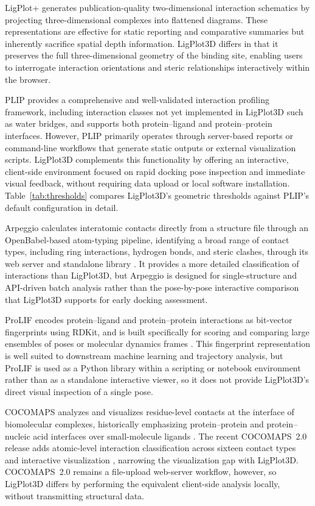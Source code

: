 \documentclass[journal=jacsat,manuscript=article]{achemso}
\begin{document}
LigPlot+ generates publication-quality two-dimensional interaction schematics by projecting three-dimensional complexes into flattened diagrams. These representations are effective for static reporting and comparative summaries but inherently sacrifice spatial depth information. LigPlot3D differs in that it preserves the full three-dimensional geometry of the binding site, enabling users to interrogate interaction orientations and steric relationships interactively within the browser.

PLIP provides a comprehensive and well-validated interaction profiling framework, including interaction classes not yet implemented in LigPlot3D such as water bridges, and supports both protein--ligand and protein--protein interfaces. However, PLIP primarily operates through server-based reports or command-line workflows that generate static outputs or external visualization scripts. LigPlot3D complements this functionality by offering an interactive, client-side environment focused on rapid docking pose inspection and immediate visual feedback, without requiring data upload or local software installation. Table~\ref{tab:thresholds} compares LigPlot3D's geometric thresholds against PLIP's default configuration in detail.

Arpeggio calculates interatomic contacts directly from a structure file through an OpenBabel-based atom-typing pipeline, identifying a broad range of contact types, including ring interactions, hydrogen bonds, and steric clashes, through its web server and standalone library \cite{jubb2017arpeggio}. It provides a more detailed classification of interactions than LigPlot3D, but Arpeggio is designed for single-structure and API-driven batch analysis rather than the pose-by-pose interactive comparison that LigPlot3D supports for early docking assessment.


ProLIF encodes protein--ligand and protein--protein interactions as bit-vector fingerprints using RDKit, and is built specifically for scoring and comparing large ensembles of poses or molecular dynamics frames \cite{bouysset2021prolif}. This fingerprint representation is well suited to downstream machine learning and trajectory analysis, but ProLIF is used as a Python library within a scripting or notebook environment rather than as a standalone interactive viewer, so it does not provide LigPlot3D's direct visual inspection of a single pose.

COCOMAPS analyzes and visualizes residue-level contacts at the interface of biomolecular complexes, historically emphasizing protein--protein and protein--nucleic acid interfaces over small-molecule ligands \cite{vangone2011cocomaps}. The recent COCOMAPS~2.0 release adds atomic-level interaction classification across sixteen contact types and interactive visualization \cite{chawla2025cocomaps2}, narrowing the visualization gap with LigPlot3D. COCOMAPS~2.0 remains a file-upload web-server workflow, however, so LigPlot3D differs by performing the equivalent client-side analysis locally, without transmitting structural data.
\end{document}
